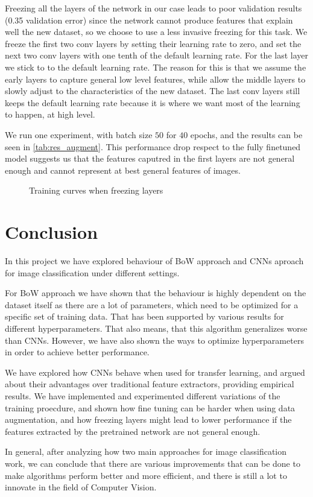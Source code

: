 \documentclass{article}
\begin{document}
Freezing all the layers of the network in our case leads to poor validation results (0.35 validation error) since the network cannot produce features that explain well the new dataset, so we choose to use a less invasive freezing for this task. We freeze the first two conv layers by setting their learning rate to zero, and set the next two conv layers with one tenth of the default learning rate. For the last layer we stick to to the default learning rate. The reason for this is that we assume the early layers to capture general low level features, while allow the middle layers to slowly adjust to the characteristics of the new dataset. The last conv layers still keeps the default learning rate because it is where we want most of the learning to happen, at high level.

We run one experiment, with batch size $50$ for $40$ epochs, and the results can be seen in \cref{tab:res_augment}. This performance drop respect to the fully finetuned model suggests us that the features caputred in the first layers are not general enough and cannot represent at best general features of images.

\begin{figure}[h]
    \centering
    \caption{Training curves when freezing layers}

\label{fig:augment}
\end{figure}

\section{Conclusion}

In this project we have explored behaviour of BoW approach and CNNs aproach for image classification under different settings.

For BoW approach we have shown that the behaviour is highly dependent on the dataset itself as there are a lot of parameters, which need to be optimized for a specific set of training data. That has been supported by various results for different hyperparameters. That also means, that this algorithm generalizes worse than CNNs. However, we have also shown the ways to optimize hyperparameters in order to achieve better performance.

We have explored how CNNs behave when used for transfer learning, and argued about their advantages over traditional feature extractors, providing empirical results. We have implemented and experimented different variations of the training proecdure, and shown how fine tuning can be harder when using data augmentation, and how freezing layers might lead to lower performance if the features extracted by the pretrained network are not general enough. 

In general, after analyzing how two main approaches for image classification work, we can conclude that there are various improvements that can be done to make algorithms perform better and more efficient, and there is still a lot to innovate in the field of Computer Vision. 



\end{document}
